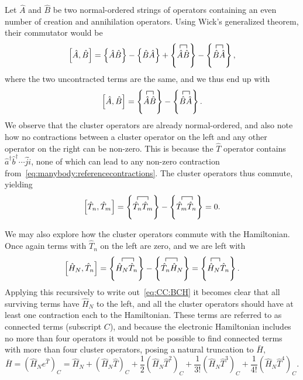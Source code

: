 Let $\hat{A}$ and $\hat{B}$ be two normal-ordered strings of operators containing an even number of creation and annihilation operators. Using Wick's generalized theorem, their commutator would be
\begin{equation}
\left[ \hat{A}, \hat{B} \right]
=
\left\lbrace \hat{A}\hat{B} \right\rbrace - \left\lbrace \hat{B}\hat{A} \right\rbrace
+
\left\lbrace
\contraction[1ex]{}{\hat{A}}{}{\hat{B}}
\hat{A}\hat{B} \right\rbrace
-
\left\lbrace
\contraction[1ex]{}{\hat{B}}{}{\hat{A}}
\hat{B}\hat{A} \right\rbrace ,
\end{equation}
where the two uncontracted terms are the same, and we thus end up with
\begin{equation}
\left[ \hat{A}, \hat{B} \right]
=
\left\lbrace
\contraction[1ex]{}{\hat{A}}{}{\hat{B}}
\hat{A}\hat{B} \right\rbrace
-
\left\lbrace
\contraction[1ex]{}{\hat{B}}{}{\hat{A}}
\hat{B}\hat{A} \right\rbrace .
\end{equation}
We observe that the cluster operators are already normal-ordered, and also note how no contractions between a cluster operator on the left and any other operator on the right can be non-zero.
This is because the $\hat{T}$ operator contains $\hat{a}^{\dagger} \hat{b}^{\dagger} \cdots \hat{j}\hat{i}$, none of which can lead to any non-zero contraction from~\eqref{eq:manybody:referencecontractions}.
The cluster operators thus commute, yielding
\begin{equation}
\left[ \hat{T}_n, \hat{T}_m \right]
=
\left\lbrace
\contraction[1ex]{}{\hat{T}_n}{}{\hat{T}_m}
\hat{T}_n \hat{T}_m \right\rbrace
-
\left\lbrace
\contraction[1ex]{}{\hat{T}_m}{}{\hat{T}_n}
\hat{T}_m \hat{T}_n \right\rbrace
=
0 .
\end{equation}

We may also explore how the cluster operators commute with the Hamiltonian.
Once again terms with $\hat{T}_n$ on the left are zero, and we are left with
\begin{equation}
\left[ \hat{H}_N, \hat{T}_n \right]
=
\left\lbrace
\contraction[1ex]{}{\hat{H}_N}{}{\hat{T}_n}
\hat{H}_N \hat{T}_n \right\rbrace
-
\left\lbrace
\contraction[1ex]{}{\hat{T}_n}{}{\hat{H}_N}
\hat{T}_n \hat{H}_N \right\rbrace
=
\left\lbrace
\contraction[1ex]{}{\hat{H}}{}{\hat{T}_n}
\hat{H}_N \hat{T}_n \right\rbrace .
\end{equation}
Applying this recursively to write out~\eqref{eq:CC:BCH} it becomes clear that all surviving terms have $\hat{H}_N$ to the left, and all the cluster operators should have at least one contraction each to the Hamiltonian.
These terms are referred to as connected terms (subscript $\mathit{C}$), and because the electronic Hamiltonian includes no more than four operators it would not be possible to find connected terms with more than four cluster operators, posing a natural truncation to $\bar{H}$, 
\begin{equation}
\label{eq:CC:barhconn}
\bar{H} 
= \left(\hat{H}_N e^{\hat{T}} \right)_{\mathit{C}}
= \hat{H}_N 
+ \left( \hat{H}_N \hat{T} \right)_{\mathit{C}}
+\frac{1}{2} \left( \hat{H}_N \hat{T}^2 \right)_{\mathit{C}}
+\frac{1}{3!} \left( \hat{H}_N \hat{T}^3 \right)_{\mathit{C}}
+\frac{1}{4!} \left( \hat{H}_N \hat{T}^4 \right)_{\mathit{C}} .
\end{equation}


